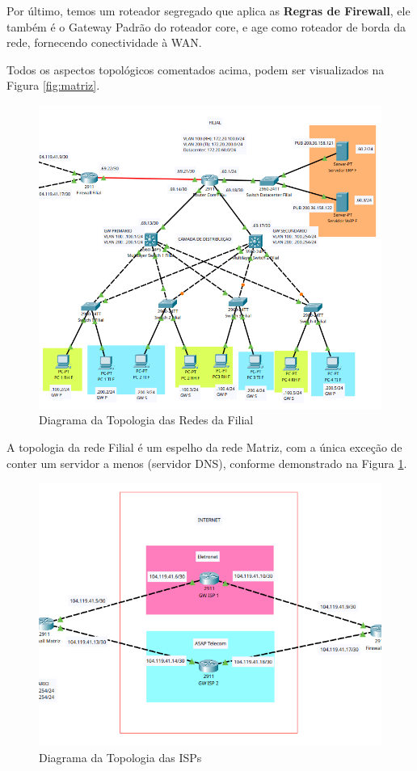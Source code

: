 \documentclass[a4paper, 12pt]{article}
\begin{document}
Por último, temos um roteador segregado que aplica as \textbf{Regras de Firewall}, ele também é o Gateway Padrão do roteador core, e age como roteador de borda da rede, fornecendo conectividade à WAN.

Todos os aspectos topológicos comentados acima, podem ser visualizados na Figura \ref{fig:matriz}.

\begin{figure}[H]
    \centering
    \includegraphics[width=0.8\linewidth]{filial.png}
    \caption{Diagrama da Topologia das Redes da Filial}
    \label{fig:filial}
\end{figure}

A topologia da rede Filial é um espelho da rede Matriz, com a única exceção de conter um servidor a menos (servidor DNS), conforme demonstrado na Figura \ref{fig:filial}.

\begin{figure}[H]
    \centering
    \includegraphics[width=0.8\linewidth]{isp.png}
    \caption{Diagrama da Topologia das ISPs}
    \label{fig:isp}
\end{figure}
\end{document}
